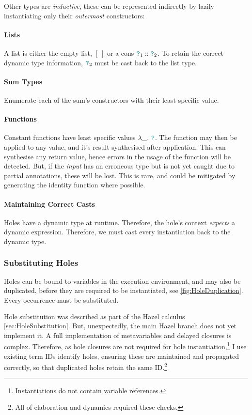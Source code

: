 Other types are \textit{inductive}, these can be represented indirectly by lazily instantiating only their \textit{outermost} constructors: 
 
\paragraph{Lists} A list is either the empty list, $[\ ]$ or a cons ${\color{teal}\texttt{?}}_1 :: {\color{teal}\texttt{?}}_2$. To retain the correct dynamic type information, ${\color{teal}\texttt{?}}_2$ must be cast back to the list type. 
\paragraph{Sum Types} Enumerate each of the sum's constructors with their least specific value.
\paragraph{Functions} Constant functions have least specific values $\lambda \_.\ {\color{teal}\texttt{?}}$. The function may then be applied to any value, and it's result synthesised after application. This can synthesise any return value, hence errors in the usage of the function will be detected. But, if the \textit{input} has an erroneous type but is not yet caught due to partial annotations, these will be lost. This is rare, and could be mitigated by generating the identity function where possible.

\paragraph{Maintaining Correct Casts}
Holes have a dynamic type at runtime. Therefore, the hole's context \textit{expects} a dynamic expression. Therefore, we must cast every instantiation back to the dynamic type.

\subsubsection{Substituting Holes}\label{sec:HoleSubstitutionImplementation}
Holes can be bound to variables in the execution environment, and may also be duplicated, before they are required to be instantiated, see \cref{fig:HoleDuplication}. Every occurrence must be substituted.

Hole substitution was described as part of the Hazel calculus \cref{sec:HoleSubstitution}. But, unexpectedly, the main Hazel branch does not yet implement it. A full implementation of metavariables and delayed closures is complex. Therefore, as hole closures are not required for hole instantiation,\footnote{Instantiations do not contain variable references.} I use existing term IDs identify holes, ensuring these are maintained and propagated correctly, so that duplicated holes retain the same ID.\footnote{All of elaboration and dynamics required these checks.}

